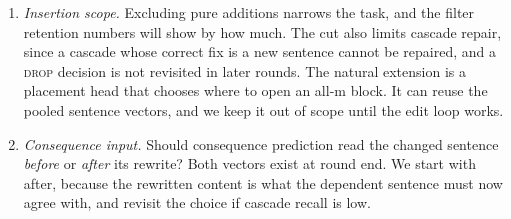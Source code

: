 \documentclass[]{paper}
\newcommand{\mask}{\ensuremath{\mathrm{m}}}
\newcommand{\drop}{\textsc{drop}}
\begin{document}
\begin{enumerate}
\item \emph{Insertion scope.} Excluding pure additions narrows the task, and the filter retention numbers will show by how much. The cut also limits cascade repair, since a cascade whose correct fix is a new sentence cannot be repaired, and a \drop{} decision is not revisited in later rounds. The natural extension is a placement head that chooses where to open an all-\mask{} block. It can reuse the pooled sentence vectors, and we keep it out of scope until the edit loop works.
\item \emph{Consequence input.} Should consequence prediction read the changed sentence \emph{before} or \emph{after} its rewrite? Both vectors exist at round end. We start with after, because the rewritten content is what the dependent sentence must now agree with, and revisit the choice if cascade recall is low.
\end{enumerate}



\end{document}
